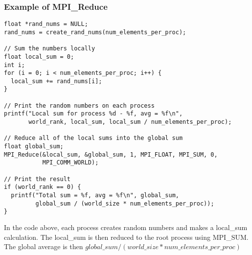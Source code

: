 \subsubsection*{Example of MPI\_Reduce}
\begin{verbatim}
float *rand_nums = NULL;
rand_nums = create_rand_nums(num_elements_per_proc);

// Sum the numbers locally
float local_sum = 0;
int i;
for (i = 0; i < num_elements_per_proc; i++) {
  local_sum += rand_nums[i];
}

// Print the random numbers on each process
printf("Local sum for process %d - %f, avg = %f\n",
       world_rank, local_sum, local_sum / num_elements_per_proc);

// Reduce all of the local sums into the global sum
float global_sum;
MPI_Reduce(&local_sum, &global_sum, 1, MPI_FLOAT, MPI_SUM, 0,
           MPI_COMM_WORLD);

// Print the result
if (world_rank == 0) {
  printf("Total sum = %f, avg = %f\n", global_sum,
         global_sum / (world_size * num_elements_per_proc));
}

\end{verbatim}
In the code above, each process creates random numbers and makes a local\_sum calculation. The local\_sum is then reduced to the root process using MPI\_SUM. The global average is then $ global\_sum / (world\_size * num\_elements\_per\_proc) $
